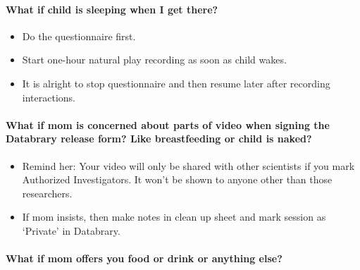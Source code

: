 \documentclass[
]{book}
\providecommand{\tightlist}{%
  \setlength{\itemsep}{0pt}\setlength{\parskip}{0pt}}
\begin{document}
\hypertarget{what-if-child-is-sleeping-when-i-get-there}{%
\paragraph*{What if child is sleeping when I get there?}\label{what-if-child-is-sleeping-when-i-get-there}}

\begin{itemize}
\tightlist
\item
  Do the questionnaire first.
\item
  Start one-hour natural play recording as soon as child wakes.
\item
  It is alright to stop questionnaire and then resume later after recording interactions.
\end{itemize}

\hypertarget{what-if-mom-is-concerned-about-parts-of-video-when-signing-the-databrary-release-form-like-breastfeeding-or-child-is-naked}{%
\paragraph*{What if mom is concerned about parts of video when signing the Databrary release form? Like breastfeeding or child is naked?}\label{what-if-mom-is-concerned-about-parts-of-video-when-signing-the-databrary-release-form-like-breastfeeding-or-child-is-naked}}

\begin{itemize}
\tightlist
\item
  Remind her: Your video will only be shared with other scientists if you mark Authorized Investigators. It won't be shown to anyone other than those researchers.
\item
  If mom insists, then make notes in clean up sheet and mark session as `Private' in Databrary.
\end{itemize}

\hypertarget{what-if-mom-offers-you-food-or-drink-or-anything-else}{%
\paragraph*{What if mom offers you food or drink or anything else?}\label{what-if-mom-offers-you-food-or-drink-or-anything-else}}
\end{document}
